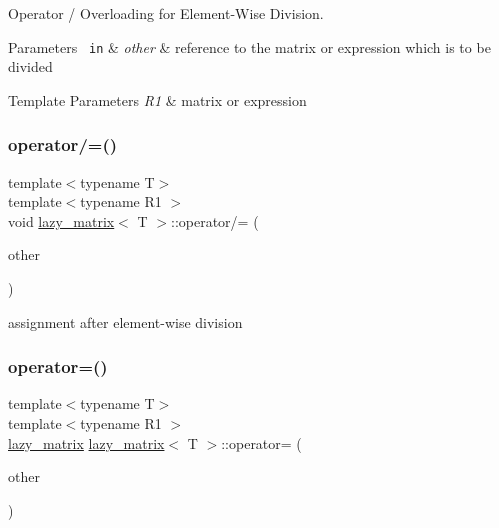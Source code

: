 Operator / Overloading for Element-\/\+Wise Division. 


\begin{DoxyParams}[1]{Parameters}
\mbox{\texttt{ in}}  & {\em other} & reference to the matrix or expression which is to be divided\\
\hline
\end{DoxyParams}

\begin{DoxyTemplParams}{Template Parameters}
{\em R1} & matrix or expression \\
\hline
\end{DoxyTemplParams}
\mbox{\label{classlazy__matrix_aa19e114755a98ae28c55cc07e06a3f1e}} 
\subsubsection{\texorpdfstring{operator/=()}{operator/=()}}
{\footnotesize\ttfamily template$<$typename T$>$ \\
template$<$typename R1 $>$ \\
void \mbox{\hyperlink{classlazy__matrix}{lazy\+\_\+matrix}}$<$ T $>$\+::operator/= (\begin{DoxyParamCaption}\item[{const R1 \&}]{other }\end{DoxyParamCaption})\hspace{0.3cm}{\ttfamily [inline]}}



assignment after element-\/wise division 

\mbox{\label{classlazy__matrix_a3104aa043b2a46f335aa697834634b7a}} 
\subsubsection{\texorpdfstring{operator=()}{operator=()}}
{\footnotesize\ttfamily template$<$typename T$>$ \\
template$<$typename R1 $>$ \\
\mbox{\hyperlink{classlazy__matrix}{lazy\+\_\+matrix}} \mbox{\hyperlink{classlazy__matrix}{lazy\+\_\+matrix}}$<$ T $>$\+::operator= (\begin{DoxyParamCaption}\item[{const R1 \&}]{other }\end{DoxyParamCaption})\hspace{0.3cm}{\ttfamily [inline]}}



